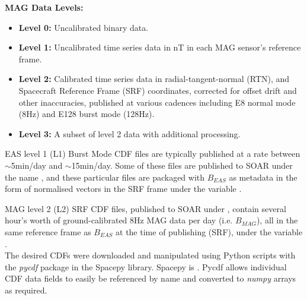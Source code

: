 \textbf{MAG Data Levels\cite{horbury2020}:}
\begin{itemize}
    \item \textbf{Level 0:} Uncalibrated binary data.
    \item \textbf{Level 1:} Uncalibrated time series data in nT in each MAG sensor's reference frame.
    \item \textbf{Level 2:} Calibrated time series data in radial-tangent-normal (RTN), and Spacecraft Reference Frame (SRF) coordinates, corrected for offset drift and other inaccuracies, published at various cadences including E8 normal mode (8Hz) and E128 burst mode (128Hz).
    \item \textbf{Level 3:} A subset of level 2 data with additional processing.
\end{itemize}


EAS level 1 (L1) Burst Mode CDF files are typically published at a rate between \(\sim\)5min/day and \(\sim\)15min/day. Some of these files are published to SOAR under the name , and these particular files are packaged with \(B_{EAS}\) as metadata in the form of normalised vectors in the SRF frame under the variable . 

MAG level 2 (L2) SRF CDF files, published to SOAR under , contain several hour's worth of ground-calibrated 8Hz MAG data per day (i.e. \(B_{MAG}\)), all in the same reference frame as \(B_{EAS}\) at the time of publishing (SRF), under the variable .
\\

The desired CDFs were downloaded and manipulated using Python scripts with the \textit{pycdf} package in the Spacepy library. Spacepy is \cite{niehof2022spacepy}. Pycdf allows individual CDF data fields to easily be referenced by name and converted to \textit{numpy} arrays as required\cite{harris2020numpy}.


